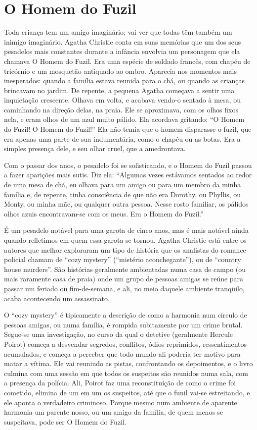 \chapter{O Homem do Fuzil}

Toda criança tem um amigo imaginário; vai ver que todas têm também um
inimigo imaginário.  Agatha Christie conta em suas memórias que um
dos seus pesadelos mais constantes durante a infância envolvia um
personagem que ela chamava O Homem do Fuzil.  Era uma espécie de
soldado francês, com chapéu de tricórnio e um mosquetão antiquado ao
ombro.  Aparecia nos momentos mais inesperados: quando a família
estava reunida para o chá, ou quando as crianças brincavam no jardim.
De repente, a pequena Agatha começava a sentir uma inquietação
crescente. Olhava em volta, e acabava vendo-o sentado à mesa, ou
caminhando na direção delas, na praia. Ele se aproximava, com os
olhos fixos nela, e eram olhos de um azul muito pálido. Ela acordava
gritando; “O Homem do Fuzil! O Homem do Fuzil!” Ela não temia que o
homem disparasse o fuzil, que era apenas uma parte de sua
indumentária, como o chapéu ou as botas.  Era a simples presença
dele, e seu olhar cruel, que a amedrontava.

Com o passar dos anos, o pesadelo foi se sofisticando, e o Homem do
Fuzil passou a fazer aparições mais sutis. Diz ela: “Algumas vezes
estávamos sentados ao redor de uma mesa de chá, eu olhava para um
amigo ou para um membro da minha família e, de repente, tinha
consciência de que não era Dorothy, ou Phyllis, ou Monty, ou minha
mãe, ou qualquer outra pessoa. Nesse rosto familiar, os pálidos olhos
azuis encontravam-se com os meus. Era o Homem do Fuzil.”

É um pesadelo notável para uma garota de cinco anos, mas é mais
notável ainda quando refletimos em quem essa garota se tornou. Agatha
Christie está entre os autores que melhor exploraram um tipo de
história que os analistas do romance policial chamam de “cozy
mystery” (“mistério aconchegante”), ou de “country house murders”.
São histórias geralmente ambientadas numa casa de campo (ou mais
raramente casa de praia) onde um grupo de pessoas amigas se reúne
para passar um feriado ou fim-de-semana, e ali, no meio daquele
ambiente tranqüilo, acaba acontecendo um assassinato.

O “cozy mystery” é tipicamente a descrição de como a harmonia num
círculo de pessoas amigas, ou numa família, é rompida subitamente por
um crime brutal. Segue-se uma investigação, no curso da qual o
detetive (geralmente Hercule Poirot) começa a desvendar segredos,
conflitos, ódios reprimidos, ressentimentos acumulados, e começa a
perceber que todo mundo ali poderia ter motivo para matar a vítima.
Ele vai reunindo as pistas, confrontando os depoimentos, e o livro
culmina com uma sessão em que todos os suspeitos são reunidos numa
sala, com a presença da polícia. Ali, Poirot faz uma reconstituição
de como o crime foi cometido, elimina de um em um os suspeitos, até
que o funil vai-se estreitando, e ele aponta o verdadeiro criminoso.
Porque mesmo num ambiente de aparente harmonia um parente nosso, ou
um amigo da família, de quem menos se suspeitava, pode ser O Homem do
Fuzil.

